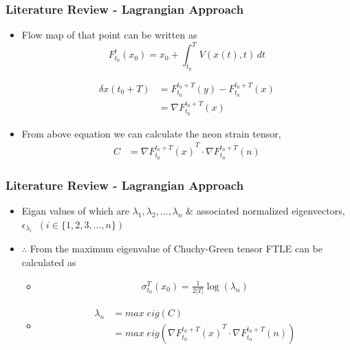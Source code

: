 \documentclass[../presentation.tex]{subfiles}
\begin{document}
\begin{frame}
  \frametitle{Literature Review - Lagrangian Approach}

  \begin{itemize}
    \item Flow map of that point can be written as
    \begin{equation}
      F_{t_0}^t(x_0) = x_0 + \int_{t_0}^{T} V(x(t), t)\,dt
    \end{equation}

    \begin{equation}
      \begin{aligned}
        \delta x(t_0 + T) &= F_{t_0}^{t_0 + T} (y) - F_{t_0}^{t_0 + T} (x) \\
        &= \nabla F_{t_0}^{t_0 + T}(x)
      \end{aligned}
    \end{equation}

    \item From above equation we can calculate the neon strain tensor,
    \begin{equation}
      \begin{aligned}
        C &= \nabla {F_{t_0}^{t_0 + T}(x)}^T \cdot \nabla F_{t_0}^{t_0 + T}(n)
      \end{aligned}
    \end{equation}
  \end{itemize}
\end{frame}

\begin{frame}
  \frametitle{Literature Review - Lagrangian Approach}

  \begin{itemize}
    \item Eigan values of which are \(\lambda_1, \lambda_2, \dots, \lambda_n\) \& associated normalized eigenvectors, \(\epsilon_{\lambda_i}\;\; (i \in \{1, 2, 3, \dots, n\})\)

    \item \(\therefore\) From the maximum eigenvalue of Chuchy-Green tensor FTLE can be calculated as
    \begin{itemize}
      \item \begin{equation}
        \begin{aligned}
          \sigma_{t_0}^T (x_0) = \frac{1}{2|T|} \log(\lambda_n)
        \end{aligned}
      \end{equation}
      
      \item \begin{equation}
        \begin{aligned}
          \lambda_n &= max\; eig (C) \\
          &= max\; eig(\nabla {F_{t_0}^{t_0 + T}(x)}^T \cdot \nabla F_{t_0}^{t_0 + T}(n))
        \end{aligned}
      \end{equation}
    \end{itemize}
  \end{itemize}
\end{frame}
\end{document}
